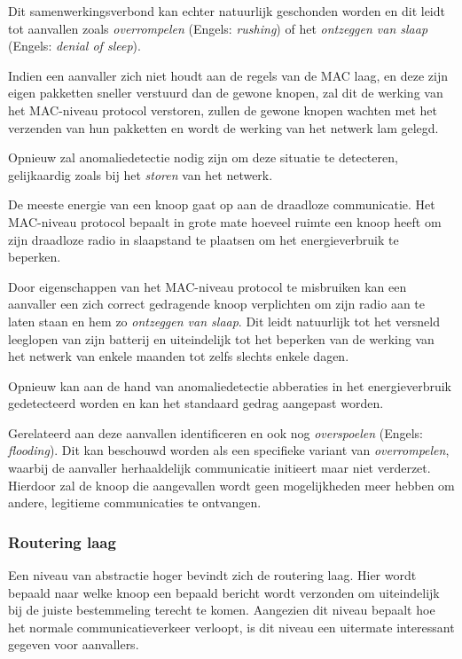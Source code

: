 Dit samenwerkingsverbond kan echter natuurlijk geschonden worden en dit leidt
tot aanvallen zoals \emph{overrompelen} (Engels: \emph{rushing}) of het
\emph{ontzeggen van slaap} (Engels: \emph{denial of sleep}).

Indien een aanvaller zich niet houdt aan de regels van de MAC laag, en deze
zijn eigen pakketten sneller verstuurd dan de gewone knopen, zal dit de werking
van het MAC-niveau protocol verstoren, zullen de gewone knopen wachten met het
verzenden van hun pakketten en wordt de werking van het netwerk lam gelegd.

Opnieuw zal anomaliedetectie nodig zijn om deze situatie te detecteren,
gelijkaardig zoals bij het \emph{storen} van het netwerk.

De meeste energie van een knoop gaat op aan de draadloze communicatie. Het
MAC-niveau protocol bepaalt in grote mate hoeveel ruimte een knoop heeft om
zijn draadloze radio in slaapstand te plaatsen om het energieverbruik te
beperken.

Door eigenschappen van het MAC-niveau protocol te misbruiken kan een aanvaller
een zich correct gedragende knoop verplichten om zijn radio aan te laten staan
en hem zo \emph{ontzeggen van slaap}. Dit leidt natuurlijk tot het versneld
leeglopen van zijn batterij en uiteindelijk tot het beperken van de werking van
het netwerk van enkele maanden tot zelfs slechts enkele dagen.

Opnieuw kan aan de hand van anomaliedetectie abberaties in het energieverbruik
gedetecteerd worden en kan het standaard gedrag aangepast worden.

Gerelateerd aan deze aanvallen identificeren \citep{dargie2010fundamentals} en
\citep{djenouri2005survey} ook nog \emph{overspoelen} (Engels: \emph{flooding}).
Dit kan beschouwd worden als een specifieke variant van \emph{overrompelen},
waarbij de aanvaller herhaaldelijk communicatie initieert maar niet verderzet.
Hierdoor zal de knoop die aangevallen wordt geen mogelijkheden meer hebben om
andere, legitieme communicaties te ontvangen.

\subsubsection*{Routering laag}

Een niveau van abstractie hoger bevindt zich de routering laag. Hier wordt
bepaald naar welke knoop een bepaald bericht wordt verzonden om uiteindelijk
bij de juiste bestemmeling terecht te komen. Aangezien dit niveau bepaalt hoe
het normale communicatieverkeer verloopt, is dit niveau een uitermate
interessant gegeven voor aanvallers.

